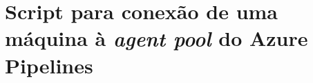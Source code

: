 \chapter{Script para conexão de uma máquina à \textit{agent pool} do Azure Pipelines}
\label{app:pipeline-start.sh}

%